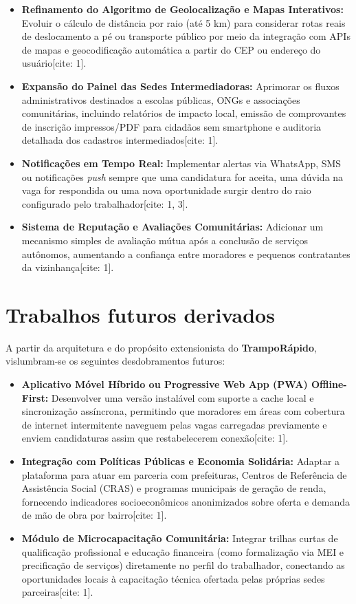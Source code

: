 \documentclass[
    12pt,
    oneside,
    a4paper,
    brazil
]{abntex2}
\begin{document}
\begin{itemize}
    \item \textbf{Refinamento do Algoritmo de Geolocalização e Mapas Interativos:} Evoluir o cálculo de distância por raio (até 5 km) para considerar rotas reais de deslocamento a pé ou transporte público por meio da integração com APIs de mapas e geocodificação automática a partir do CEP ou endereço do usuário[cite: 1].
    \item \textbf{Expansão do Painel das Sedes Intermediadoras:} Aprimorar os fluxos administrativos destinados a escolas públicas, ONGs e associações comunitárias, incluindo relatórios de impacto local, emissão de comprovantes de inscrição impressos/PDF para cidadãos sem smartphone e auditoria detalhada dos cadastros intermediados[cite: 1].
    \item \textbf{Notificações em Tempo Real:} Implementar alertas via WhatsApp, SMS ou notificações \textit{push} sempre que uma candidatura for aceita, uma dúvida na vaga for respondida ou uma nova oportunidade surgir dentro do raio configurado pelo trabalhador[cite: 1, 3].
    \item \textbf{Sistema de Reputação e Avaliações Comunitárias:} Adicionar um mecanismo simples de avaliação mútua após a conclusão de serviços autônomos, aumentando a confiança entre moradores e pequenos contratantes da vizinhança[cite: 1].
\end{itemize}

\section{Trabalhos futuros derivados}

A partir da arquitetura e do propósito extensionista do \textbf{TrampoRápido}, vislumbram-se os seguintes desdobramentos futuros:

\begin{itemize}
    \item \textbf{Aplicativo Móvel Híbrido ou Progressive Web App (PWA) Offline-First:} Desenvolver uma versão instalável com suporte a cache local e sincronização assíncrona, permitindo que moradores em áreas com cobertura de internet intermitente naveguem pelas vagas carregadas previamente e enviem candidaturas assim que restabelecerem conexão[cite: 1].
    \item \textbf{Integração com Políticas Públicas e Economia Solidária:} Adaptar a plataforma para atuar em parceria com prefeituras, Centros de Referência de Assistência Social (CRAS) e programas municipais de geração de renda, fornecendo indicadores socioeconômicos anonimizados sobre oferta e demanda de mão de obra por bairro[cite: 1].
    \item \textbf{Módulo de Microcapacitação Comunitária:} Integrar trilhas curtas de qualificação profissional e educação financeira (como formalização via MEI e precificação de serviços) diretamente no perfil do trabalhador, conectando as oportunidades locais à capacitação técnica ofertada pelas próprias sedes parceiras[cite: 1].
\end{itemize}
\end{document}
